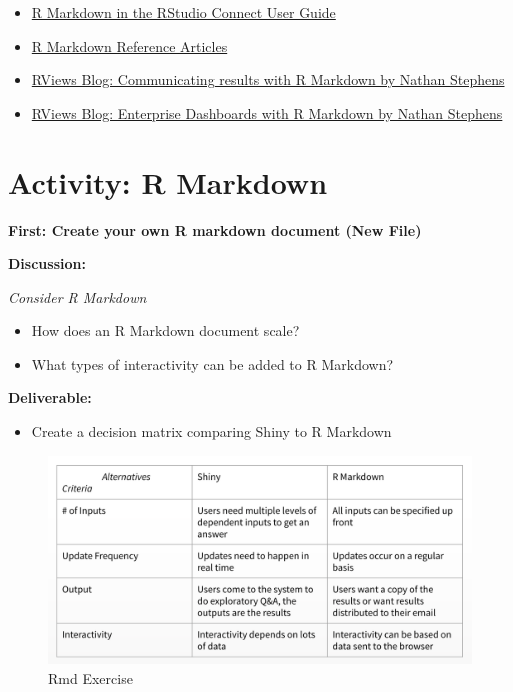 \documentclass[]{book}
\providecommand{\tightlist}{%
  \setlength{\itemsep}{0pt}\setlength{\parskip}{0pt}}
\theoremstyle{definition}
\theoremstyle{definition}
\theoremstyle{definition}
\theoremstyle{remark}
\begin{document}
\begin{itemize}
\tightlist
\item
  \href{https://docs.rstudio.com/connect/user/r-markdown.html}{R
  Markdown in the RStudio Connect User Guide}
\item
  \href{https://rmarkdown.rstudio.com/articles.html}{R Markdown
  Reference Articles}
\item
  \href{https://rviews.rstudio.com/2018/11/01/r-markdown-a-better-approach/}{RViews
  Blog: Communicating results with R Markdown by Nathan Stephens}
\item
  \href{https://rviews.rstudio.com/2018/05/16/replacing-excel-reports-with-r-markdown-and-shiny/}{RViews
  Blog: Enterprise Dashboards with R Markdown by Nathan Stephens}
\end{itemize}

\hypertarget{activity-r-markdown}{%
\section{Activity: R Markdown}\label{activity-r-markdown}}

\textbf{First: Create your own R markdown document (New File)}

\textbf{Discussion:}

\emph{Consider R Markdown}

\begin{itemize}
\tightlist
\item
  How does an R Markdown document scale?
\item
  What types of interactivity can be added to R Markdown?
\end{itemize}

\textbf{Deliverable:}

\begin{itemize}
\tightlist
\item
  Create a decision matrix comparing Shiny to R Markdown
\end{itemize}

\begin{figure}
\centering
\includegraphics{imgs/shiny-alt/rmd-answers.png}
\caption{Rmd Exercise}
\end{figure}
\end{document}
